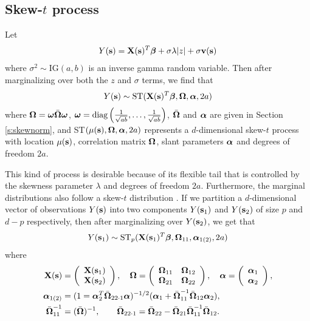 \documentclass[11pt]{article}
\begin{document}
\subsection{Skew-$t$ process} \label{s:skewt}
Let
\begin{align}
  Y(\mbox{\bf s}) = \mbox{\bf X}(\mbox{\bf s})^T \mbox{\boldmath $\beta$} + \sigma \lambda |z| + \sigma \mbox{\bf v}(\mbox{\bf s})
\end{align}
where $\sigma^2 \sim \text{IG}(a, b)$ is an inverse gamma random variable.
Then after marginalizing over both the $z$ and $\sigma$ terms, we find that
\begin{align}
  Y(\mbox{\bf s}) \sim \text{ST}(\mbox{\bf X}(\mbox{\bf s})^T \mbox{\boldmath $\beta$}, \mbox{\boldmath $\Omega$}, \mbox{\boldmath $\alpha$}, 2a) \label{eq:fullmodel}
\end{align}
where $\mbox{\boldmath $\Omega$} = \mbox{\boldmath $\omega$} \bar{\mbox{\boldmath $\Omega$}} \mbox{\boldmath $\omega$}$, $\mbox{\boldmath $\omega$} = \text{diag}\left(\frac{1}{ \sqrt{ab}}, \ldots, \frac{1}{\sqrt{ab}}\right)$, $\bar{\mbox{\boldmath $\Omega$}}$ and $\mbox{\boldmath $\alpha$}$ are given in Section \ref{s:skewnorm}, and ST$(\mu(\mbox{\bf s}), \mbox{\boldmath $\Omega$}, \mbox{\boldmath $\alpha$}, 2a)$ represents a $d$-dimensional skew-$t$ process with location $\mu(\mbox{\bf s})$, correlation matrix $\mbox{\boldmath $\Omega$}$, slant parameters $\mbox{\boldmath $\alpha$}$ and degrees of freedom $2a$.

This kind of process is desirable because of its flexible tail that is controlled by the skewness parameter $\lambda$ and degrees of freedom $2a$.
Furthermore, the marginal distributions also follow a skew-$t$ distribution \citep{Azzalini2013}.
If we partition a $d$-dimensional vector of observations $Y(\mbox{\bf s})$ into two components $Y(\mbox{\bf s}_1)$ and $Y(\mbox{\bf s}_2)$ of size $p$ and $d - p$ respectively, then after marginalizing over $Y(\mbox{\bf s}_2)$, we get that
\begin{align}
  Y(\mbox{\bf s}_1) \sim \text{ST}_p(\mbox{\bf X}(\mbox{\bf s}_1)^T \mbox{\boldmath $\beta$}, \mbox{\boldmath $\Omega$}_{11}, \mbox{\boldmath $\alpha$}_{1(2)}, 2a)
\end{align}
where
\begin{align}
  \mbox{\bf X}(\mbox{\bf s}) &= \left( \begin{array}{c}
    \mbox{\bf X}(\mbox{\bf s}_1) \\
    \mbox{\bf X}(\mbox{\bf s}_2)
  \end{array} \right), \quad
  \mbox{\boldmath $\Omega$} = \left( \begin{array}{cc}
    \mbox{\boldmath $\Omega$}_{11} & \mbox{\boldmath $\Omega$}_{12} \\
    \mbox{\boldmath $\Omega$}_{21} & \mbox{\boldmath $\Omega$}_{22}
  \end{array} \right), \quad
  \mbox{\boldmath $\alpha$} = \left(\begin{array}{c}
    \mbox{\boldmath $\alpha$}_1\\
    \mbox{\boldmath $\alpha$}_2
  \end{array} \right),\\
  \mbox{\boldmath $\alpha$}_{1(2)} &= (1 = \mbox{\boldmath $\alpha$}_2^T \bar{\mbox{\boldmath $\Omega$}}_{22 \cdot 1} \mbox{\boldmath $\alpha$})^{-1/2}(\mbox{\boldmath $\alpha$}_1 + \bar{\mbox{\boldmath $\Omega$}}_{11}^{-1} \bar{\mbox{\boldmath $\Omega$}}_{12} \mbox{\boldmath $\alpha$}_{2}),\\
  \bar{\mbox{\boldmath $\Omega$}}_{11}^{-1} &= (\bar{\mbox{\boldmath $\Omega$}})^{-1}, \qquad \bar{\mbox{\boldmath $\Omega$}}_{22 \cdot 1} = \bar{\mbox{\boldmath $\Omega$}}_{22} - \bar{\mbox{\boldmath $\Omega$}}_{21} \bar{\mbox{\boldmath $\Omega$}}_{11}^{-1} \bar{\mbox{\boldmath $\Omega$}}_{12}.
\end{align}
\end{document}
